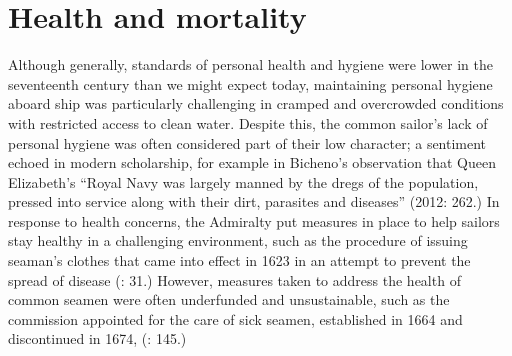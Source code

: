 \section{\textbf{Health} \textbf{and} \textbf{mortality}  }%

Although generally, standards of personal health and hygiene were lower in the seventeenth century than we might expect today, maintaining personal hygiene aboard ship was particularly challenging in cramped and overcrowded conditions with restricted access to clean water. Despite this, the common sailor’s lack of personal hygiene was often considered part of their low character; a sentiment echoed in modern scholarship, for example in Bicheno’s observation that Queen Elizabeth’s “Royal Navy was largely manned by the dregs of the population, pressed into service along with their dirt, parasites and diseases” (2012: 262.) In response to health concerns, the Admiralty put measures in place to help sailors stay healthy in a challenging environment, such as the procedure of issuing seaman’s clothes that came into effect in 1623 in an attempt to prevent the spread of disease (\citealt{Brown2011}: 31.) However, measures taken to address the health of common seamen were often underfunded and unsustainable, such as the commission appointed for the care of sick seamen, established in 1664 and discontinued in 1674, (\citealt{Lincoln2015}: 145.)

